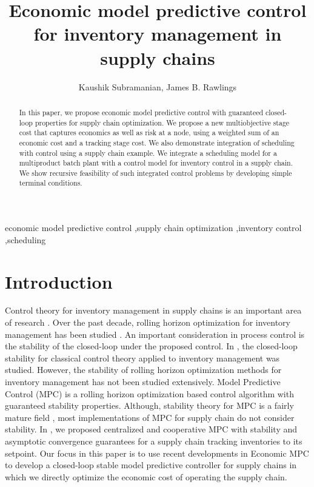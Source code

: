 \documentclass{elsarticle}
\title{Economic model predictive control for inventory management in
    supply chains}
\author{Kaushik Subramanian, James B. Rawlings \corref{cor1}} \author
\theoremstyle{definition}
\begin{document}
\begin{abstract}
  In this paper, we propose economic model predictive control 
 with guaranteed closed-loop properties for supply chain optimization. We
  propose a new multiobjective stage cost that captures economics as
  well as risk at a node, using a weighted sum of an economic cost and
  a tracking stage cost. We also demonstrate integration of scheduling
  with control using a supply chain example. We integrate a scheduling
  model for a multiproduct batch plant with a control model for
  inventory control in a supply chain. We show recursive feasibility
  of such integrated control problems by developing simple terminal
  conditions.
\end{abstract}
\begin{keyword} economic model predictive control \sep supply chain
  optimization \sep inventory control \sep scheduling
\end{keyword}
\maketitle
\section{Introduction}
Control theory for inventory management in supply chains is an
important area of research
\cite{sarimevis:patrinos:tarantilis:kiranoudis:2008,
  ortega:lin:2004}. Over the past decade, rolling
horizon optimization for inventory management has been studied \cite{perealopez:ydstie:grossmann:2003,mestan:turkay:arkun:2006,dunbar:desa:2007a,seferlis:giannelos:2004, kempf:2004,braun:rivera:flores:carlyle:kempf:2003,Maestre:Pena:Camacho:2009,maestre:pena:camacho:2011}. An
important consideration in process control is the stability of the
closed-loop under the proposed control. In
\cite{lin:wong:jang:shieh:chu:2004, venkateswaran:son:2005,
  hoberg:bradley:thonemann:2007}, the closed-loop stability for
classical control theory applied to inventory management was
studied. However, the stability of rolling horizon optimization
methods for inventory management has not been studied extensively.
Model Predictive
Control (MPC) is a rolling horizon optimization based control
algorithm with guaranteed stability properties.
Although, stability theory for MPC is a fairly mature field
\cite{rawlings:mayne:2009}, most 
implementations of MPC for supply chain do not consider stability. In
\cite{subramanian:rawlings:maravelias:2013}, we proposed centralized
and cooperative MPC with stability and asymptotic convergence
guarantees for a supply chain tracking inventories to its
setpoint. Our focus in this paper is to use recent developments in 
Economic MPC \cite{amrit:rawlings:angeli:2011,
  diehl:amrit:rawlings:2011} to develop a closed-loop stable model
predictive controller for supply chains in which we directly optimize
the economic cost of operating the supply chain.
\end{document}
